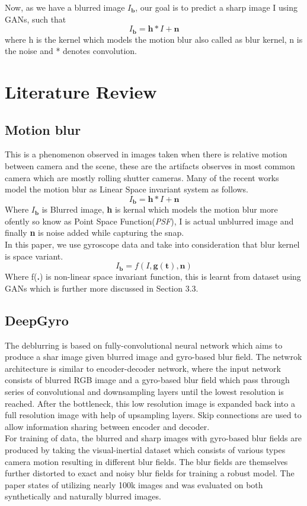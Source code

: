 \documentclass[10pt,twocolumn,letterpaper]{article}
\begin{document}
Now, as we have a blurred image $I_{\textbf{b}}$, our goal is to predict a sharp image I using GANs, such that 
\begin{equation}
I_{\textbf{b}} = \textbf{h}*I + \textbf{n}
\end{equation}
where h is the kernel which models the motion blur also called as blur kernel, n is the noise and * denotes convolution.

\section{Literature Review}
\label{sec:literature}
\subsection{Motion blur}
This is a phenomenon observed in images taken when there is relative motion between camera and the scene, these are the artifacts observes in most common camera which are mostly rolling shutter cameras. Many of the recent works model the motion blur as Linear Space invariant system as follows.
\begin{equation}
I_{\textbf{b}} = \textbf{h}*I + \textbf{n}
\end{equation}
Where $I_{\textbf{b}}$ is Blurred image, \textbf{h} is kernal which models the motion blur more ofently so know as Point Space Function(\textit{PSF}), I is actual unblurred image and finally \textbf{n} is noise added while capturing the snap.\\

In this paper, we use gyroscope data and take into consideration that blur kernel is space variant.
\begin{equation}
I_{\textbf{b}} = f\left(I, \textbf{g}(\textbf{t}), \textbf{n}\right)
\end{equation}
Where f(\textbf{.}) is non-linear space invariant function, this is learnt from dataset using GANs which is further more discussed in Section 3.3.
\subsection{DeepGyro}
The deblurring is based on fully-convolutional neural network which aims to produce a shar image given blurred image and gyro-based blur field. The netwrok architecture is similar to encoder-decoder network, where the input network consists of blurred RGB image and a gyro-based blur field which pass through series of convolutional and downsampling layers until the lowest resolution is reached. After the bottleneck, this low resolution image is expanded back into a full resolution image with help of upsampling layers. Skip connections are used to allow information sharing between encoder and decoder.\\
For training of data, the blurred and sharp images with gyro-based blur fields are produced by taking the visual-inertial dataset which consists of various types camera motion resulting in different blur fields. The blur fields are themselves further distorted to exact and noisy blur fields for training a robust model. The paper states of utilizing nearly 100k images and was evaluated on both synthetically and naturally blurred images.
\\
\end{document}
